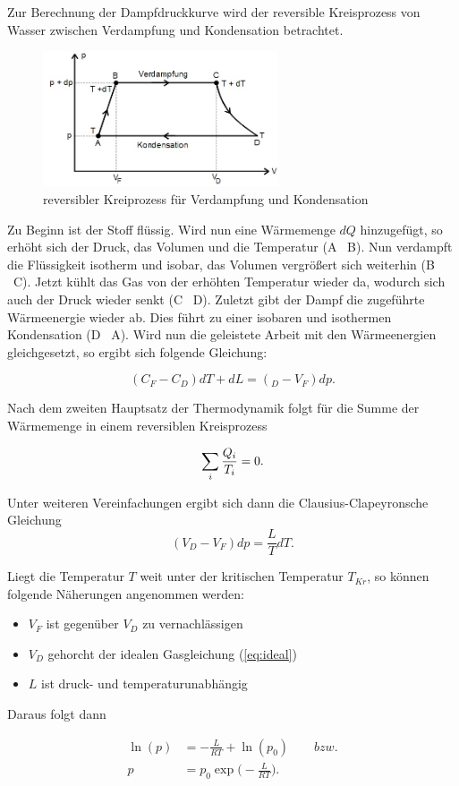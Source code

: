 Zur Berechnung der Dampfdruckkurve wird der reversible Kreisprozess von Wasser
zwischen Verdampfung und Kondensation betrachtet.

\begin{figure}
  \centering
  \includegraphics[height=4cm]{Kreisprozess.jpeg}
  \caption{reversibler Kreiprozess für Verdampfung und Kondensation}
  \label{fig:kreis}
\end{figure}

Zu Beginn ist der Stoff flüssig. Wird nun eine Wärmemenge $dQ$ hinzugefügt,
so erhöht sich der Druck, das Volumen und die Temperatur (A \rightarrow \ B).
Nun verdampft die Flüssigkeit isotherm und isobar, das Volumen
vergrößert sich weiterhin (B \rightarrow \ C). Jetzt kühlt das Gas von der erhöhten
Temperatur wieder da, wodurch sich auch der Druck wieder senkt (C \rightarrow \ D).
Zuletzt gibt der Dampf die zugeführte Wärmeenergie wieder ab. Dies führt zu einer
isobaren und isothermen Kondensation (D \rightarrow \ A).
Wird nun die geleistete Arbeit mit den Wärmeenergien gleichgesetzt, so ergibt sich
folgende Gleichung:

\begin{equation}
  (C_F - C_D)dT + dL = (_D - V_F)dp .
\end{equation}

Nach dem zweiten Hauptsatz der Thermodynamik folgt für die Summe der Wärmemenge
in einem reversiblen Kreisprozess

\begin{equation}
  \sum_i{\frac{Q_i}{T_i}} = 0 . \notag
\end{equation}

Unter weiteren Vereinfachungen ergibt sich dann die Clausius-Clapeyronsche
Gleichung
\begin{equation}
  (V_D - V_F)dp = \frac{L}{T}dT \label{eq:clausius}.
\end{equation}

Liegt die Temperatur $T$ weit unter der kritischen Temperatur $T_{Kr}$, so können
folgende Näherungen angenommen werden:
\begin{itemize}
  \item $V_F$ ist gegenüber $V_D$ zu vernachlässigen \\
  \item $V_D$ gehorcht der idealen Gasgleichung (\ref{eq:ideal}) \\
  \item $L$ ist druck- und temperaturunabhängig \\
\end{itemize}

Daraus folgt dann

\begin{align}
  \ln{(p)} &= -\frac{L}{RT} + \ln{(p_0)}  \qquad bzw. \label{eq:3}  \\
  p &= p_0 \exp{\biggr(-\frac{L}{RT} \biggl)} . \label{eq:4}
\end{align} \cite{TU}
